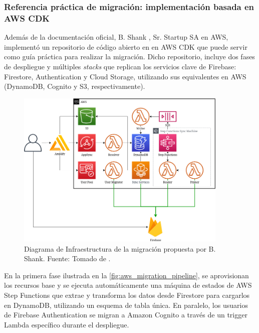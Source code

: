 \subsubsection{Referencia práctica de migración: implementación basada en AWS CDK}

Además de la documentación oficial, B. Shank \cite{Shank2021}, Sr. Startup SA en AWS, implementó un repositorio de código abierto en en AWS CDK que puede servir como guía práctica para realizar la migración. Dicho repositorio, incluye dos fases de despliegue y múltiples \textit{stacks} que replican los servicios clave de Firebase: Firestore, Authentication y Cloud Storage, utilizando sus equivalentes en AWS (DynamoDB, Cognito y S3, respectivamente).

\newcommand\DiagramaMigracionAWSCaption{Diagrama de Infraestructura de la migración propuesta por B. Shank. \hspace{1em}}
\begin{figure}[H]
\centering
\includegraphics[width=0.9\textwidth]{img/figures/fig5-etl-pipeline-aws.png}
\caption[\DiagramaMigracionAWSCaption]{\DiagramaMigracionAWSCaption Fuente: Tomado de \cite{Shank2021}.}
\label{fig:aws_migration_pipeline}
\end{figure}

En la primera fase ilustrada en la \autoref{fig:aws_migration_pipeline}, se aprovisionan los recursos base y se ejecuta automáticamente una máquina de estados de AWS Step Functions que extrae y transforma los datos desde Firestore para cargarlos en DynamoDB, utilizando un esquema de tabla única. En paralelo, los usuarios de Firebase Authentication se migran a Amazon Cognito a través de un trigger Lambda específico durante el despliegue.

